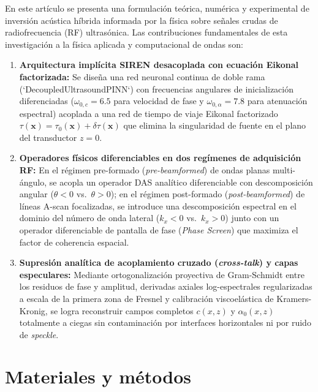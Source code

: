 \documentclass[9pt]{article}
\begin{document}
En este artículo se presenta una formulación teórica, numérica y experimental de inversión acústica híbrida informada por la física sobre señales crudas de radiofrecuencia (RF) ultrasónica. Las contribuciones fundamentales de esta investigación a la física aplicada y computacional de ondas son:
\begin{enumerate}
    \item \textbf{Arquitectura implícita SIREN desacoplada con ecuación Eikonal factorizada:} Se diseña una red neuronal continua de doble rama (`DecoupledUltrasoundPINN`) con frecuencias angulares de inicialización diferenciadas ($\omega_{0,c}=6.5$ para velocidad de fase y $\omega_{0,\alpha}=7.8$ para atenuación espectral) acoplada a una red de tiempo de viaje Eikonal factorizado $\tau(\mathbf{x}) = \tau_0(\mathbf{x}) + \delta\tau(\mathbf{x})$ que elimina la singularidad de fuente en el plano del transductor $z=0$.
    \item \textbf{Operadores físicos diferenciables en dos regímenes de adquisición RF:} En el régimen pre-formado (\textit{pre-beamformed}) de ondas planas multi-ángulo, se acopla un operador DAS analítico diferenciable con descomposición angular ($\theta < 0$ vs.\ $\theta > 0$); en el régimen post-formado (\textit{post-beamformed}) de líneas A-scan focalizadas, se introduce una descomposición espectral en el dominio del número de onda lateral ($k_x < 0$ vs.\ $k_x > 0$) junto con un operador diferenciable de pantalla de fase (\textit{Phase Screen}) que maximiza el factor de coherencia espacial.
    \item \textbf{Supresión analítica de acoplamiento cruzado (\textit{cross-talk}) y capas especulares:} Mediante ortogonalización proyectiva de Gram-Schmidt entre los residuos de fase y amplitud, derivadas axiales log-espectrales regularizadas a escala de la primera zona de Fresnel y calibración viscoelástica de Kramers-Kronig, se logra reconstruir campos completos $c(x,z)$ y $\alpha_0(x,z)$ totalmente a ciegas sin contaminación por interfaces horizontales ni por ruido de \textit{speckle}.
\end{enumerate}

\section{Materiales y métodos}
\label{sec:metodos}
\end{document}
